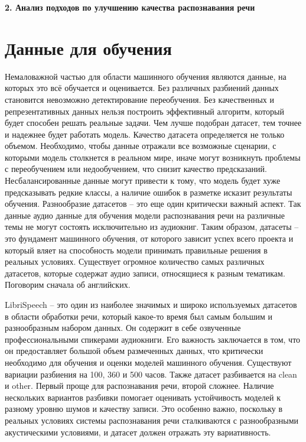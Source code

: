 \newpage
\begin{center}
  \textbf{\large 2. Анализ подходов по улучшению качества распознавания речи}
\end{center}

\section{Данные для обучения}

Немаловажной частью для области машинного обучения являются данные, на которых это всё обучается и оценивается.
Без различных разбиений данных становится невозможно детектирование переобучения.
Без качественных и репрезентативных данных нельзя построить эффективный алгоритм, который будет способен решать реальные задачи.
Чем лучше подобран датасет, тем точнее и надежнее будет работать модель.
Качество датасета определяется не только объемом.
Необходимо, чтобы данные отражали все возможные сценарии, с которыми модель столкнется в реальном мире, иначе могут возникнуть проблемы с переобучением или недообучением, что снизит качество предсказаний.
Несбалансированные данные могут привести к тому, что модель будет хуже предсказывать редкие классы, а наличие ошибок в разметке исказит результаты обучения.
Разнообразие датасетов -- это еще один критически важный аспект.
Так данные аудио данные для обучения модели распознавания речи на различные темы не могут состоять исключительно из аудиокниг.
Таким образом, датасеты -- это фундамент машинного обучения, от которого зависит успех всего проекта и который вляет на способность модели принимать правильные решения в реальных условиях.
Существует огромное количество самых различных датасетов, которые содержат аудио записи, относящиеся  к разным тематикам.
Поговорим сначала об английских.

LibriSpeech\cite{panayotov2015librispeech} -- это один из наиболее значимых и широко используемых датасетов в области обработки речи, который какое-то время был самым большим и разнообразным набором данных.
Он содержит в себе озвученные профессиональными спикерами аудиокниги.
Его важность заключается в том, что он предоставляет большой объем размеченных данных, что критически необходимо для обучения и оценки моделей машинного обучения.
Существуют вариации разбиения на 100, 360 и 500 часов.
Также датасет разбивается на clean и other.
Первый проще для распознавания речи, второй сложнее.
Наличие нескольких вариантов разбивки помогает оценивать устойчивость моделей к разному уровню шумов и качеству записи.
Это особенно важно, поскольку в реальных условиях системы распознавания речи сталкиваются с разнообразными акустическими условиями, и датасет должен отражать эту вариативность.

